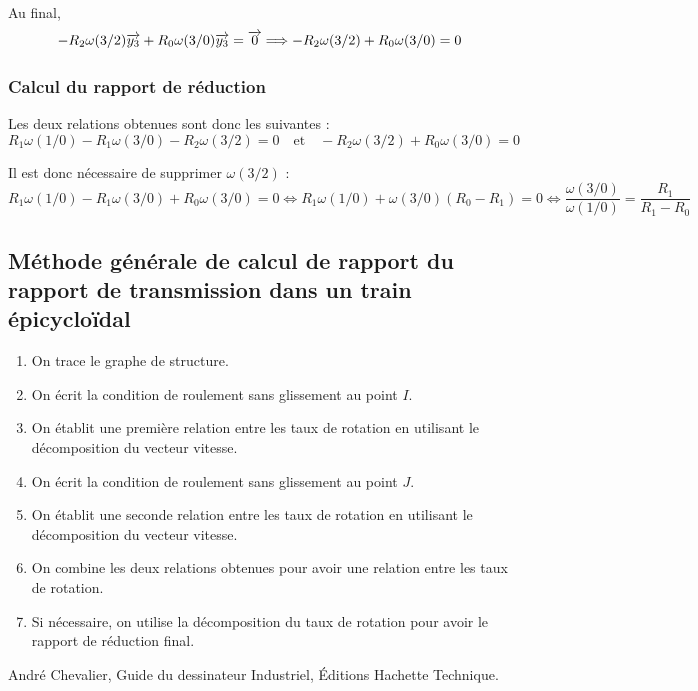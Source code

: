 \documentclass[10pt,oneside]{article}
\begin{document}
\vspace{.25cm}

Au final, 
$$
-R_2 \omega(3/2)\overrightarrow{y_3} + R_0 \omega(3/0)\overrightarrow{y_3}= \overrightarrow{0}
\Longrightarrow 
-R_2 \omega(3/2) + R_0 \omega(3/0)= 0
$$

\subsubsection{Calcul du rapport de réduction}
Les deux relations obtenues sont donc les suivantes : 
$$
R_1 \omega(1/0) -R_1 \omega(3/0)  -R_2 \omega(3/2) = 0 
\quad \text{et} \quad
-R_2 \omega(3/2) + R_0 \omega(3/0)= 0
$$

Il est donc nécessaire de supprimer $\omega(3/2)$ :
$$
R_1 \omega(1/0) -R_1 \omega(3/0) +  R_0 \omega(3/0) = 0 
\Longleftrightarrow
R_1 \omega(1/0) + \omega(3/0) \left(R_0 -R_1 \right) = 0 
\Longleftrightarrow
\dfrac{\omega(3/0)}{\omega(1/0)} = \dfrac{R_1}{R_1 -R_0}
$$
\subsection{Méthode générale de calcul de rapport du rapport de transmission dans un train épicycloïdal}

\begin{methode}
\begin{enumerate}
\item On trace le graphe de structure.
\item On écrit la condition de roulement sans glissement au point $I$. 
\item On établit une première relation entre les taux de rotation en utilisant le décomposition du vecteur vitesse.
\item On écrit la condition de roulement sans glissement au point $J$.
\item On établit une seconde relation  entre les taux de rotation en utilisant le décomposition du vecteur vitesse.
\item On combine les deux relations obtenues pour avoir une relation entre les taux de rotation.
\item Si nécessaire, on utilise la décomposition du taux de rotation pour avoir le rapport de réduction final.
\end{enumerate}
\end{methode}


\begin{thebibliography}{2}
 André Chevalier, Guide du dessinateur Industriel, Éditions Hachette Technique.
\end{thebibliography}
\end{document}
